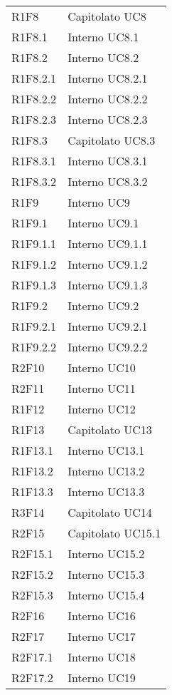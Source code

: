 \begin{longtable} {
			>{\centering}p{28mm}  
			>{}p{20mm}
		}
		R1F8 & Capitolato UC8 \TBstrut \\ [2mm]
		R1F8.1 & Interno UC8.1 \TBstrut \\ [2mm]
		R1F8.2 & Interno UC8.2 \TBstrut \\ [2mm]
		R1F8.2.1 & Interno UC8.2.1 \TBstrut \\ [2mm]
		R1F8.2.2 & Interno UC8.2.2 \TBstrut \\ [2mm]
		R1F8.2.3 & Interno UC8.2.3 \TBstrut \\ [2mm]
		R1F8.3 & Capitolato UC8.3 \TBstrut \\ [2mm]
		R1F8.3.1 & Interno UC8.3.1 \TBstrut \\ [2mm]
		R1F8.3.2 & Interno UC8.3.2 \TBstrut \\ [2mm]
		R1F9 & Interno UC9 \TBstrut \\ [2mm]
		R1F9.1 & Interno UC9.1 \TBstrut \\ [2mm]
		R1F9.1.1 & Interno UC9.1.1 \TBstrut \\ [2mm]
		R1F9.1.2 & Interno UC9.1.2 \TBstrut \\ [2mm]
		R1F9.1.3 & Interno UC9.1.3 \TBstrut \\ [2mm]
		R1F9.2 & Interno UC9.2 \TBstrut \\ [2mm]
		R1F9.2.1 & Interno UC9.2.1 \TBstrut \\ [2mm]
		R1F9.2.2 & Interno UC9.2.2 \TBstrut \\ [2mm]
		R2F10 & Interno UC10 \TBstrut \\ [2mm]
		R2F11 & Interno UC11 \TBstrut \\ [2mm]		
		R1F12 & Interno UC12 \TBstrut \\ [2mm]	
		R1F13 & Capitolato UC13 \TBstrut \\ [2mm]		
		R1F13.1 & Interno UC13.1 \TBstrut \\ [2mm]		
		R1F13.2 & Interno UC13.2 \TBstrut \\ [2mm]		
		R1F13.3 & Interno UC13.3 \TBstrut \\ [2mm]		
		R3F14 & Capitolato UC14 \TBstrut \\ [2mm]		
		R2F15 & Capitolato UC15.1 \TBstrut \\ [2mm]		
		R2F15.1 & Interno UC15.2 \TBstrut \\ [2mm]		
		R2F15.2 & Interno UC15.3 \TBstrut \\ [2mm]		
		R2F15.3 & Interno UC15.4 \TBstrut \\ [2mm]
		R2F16 & Interno UC16 \TBstrut \\ [2mm]	
		R2F17 &	Interno UC17 \TBstrut \\ [2mm]
		R2F17.1 & Interno UC18 \TBstrut \\ [2mm]		
		R2F17.2 & Interno UC19 \TBstrut \\ [2mm]
		

\end{longtable}
